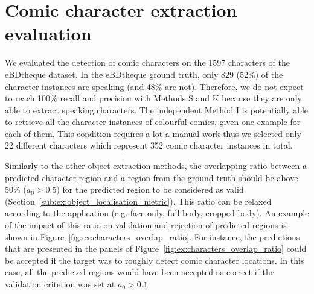 




\section{Comic character extraction evaluation} %
\label{sec:comic_character_extraction_evaluation}
We evaluated the detection of comic characters on the 1597 characters of the eBDtheque dataset.
In the eBDtheque ground truth, only 829 (52\%) of the character instances are speaking (and 48\% are not).
Therefore, we do not expect to reach 100\% recall and precision with Methods S and K because they are only able to extract speaking characters.
The independent Method I is potentially able to retrieve all the character instances of colourful comics, given one example for each of them.
This condition requires a lot a manual work thus we selected only 22 different characters which represent 352 comic character instances in total.


Similarly to the other object extraction methods, the overlapping ratio between a predicted character region and a region from the ground truth should be above 50\% ($a_0>0.5$) for the predicted region to be considered as valid (Section~\ref{sub:ex:object_localisation_metric}).
This ratio can be relaxed according to the application (e.g. face only, full body, cropped body).
An example of the impact of this ratio on validation and rejection of predicted regions is shown in Figure~\ref{fig:ex:characters_overlap_ratio}.
For instance, the predictions that are presented in the panels of Figure~\ref{fig:ex:characters_overlap_ratio} could be accepted if the target was to roughly detect comic character locations.
In this case, all the predicted regions would have been accepted as correct if the validation criterion was set at $a_0>0.1$.



